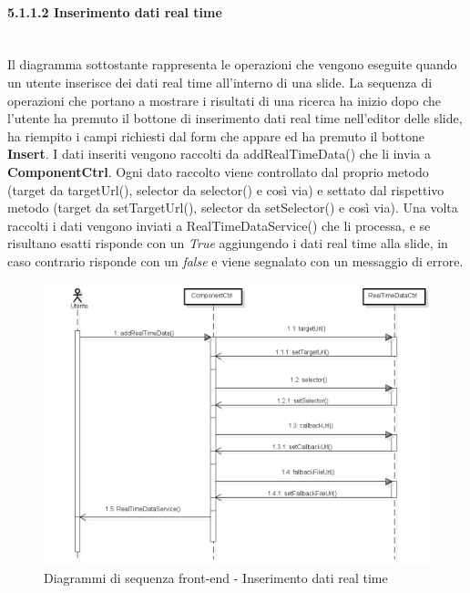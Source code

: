 \paragraph{5.1.1.2 Inserimento dati real time}\mbox{}\\

\noindent Il diagramma sottostante rappresenta le operazioni che vengono eseguite quando un utente inserisce dei dati real time all'interno di una slide. La sequenza di operazioni che portano a mostrare i risultati di una ricerca ha inizio dopo che l'utente ha premuto il bottone di inserimento dati real time nell'editor delle slide, ha riempito i campi richiesti dal form che appare ed ha premuto il bottone \textbf{Insert}. I dati inseriti vengono raccolti da addRealTimeData() che li invia a \textbf{ComponentCtrl}. Ogni dato raccolto viene controllato dal proprio metodo (target da targetUrl(), selector da selector() e così via) e settato dal rispettivo metodo (target da setTargetUrl(), selector da setSelector() e così via). Una volta raccolti i dati vengono inviati a RealTimeDataService() che li processa, e se risultano esatti risponde con un \textit{True} aggiungendo i dati real time alla slide, in caso contrario risponde con un \textit{false} e viene segnalato con un  messaggio di errore.

\begin{figure}[H] 
	\centering 
	\includegraphics[scale=0.60] {img/realtime.png}
	\caption{Diagrammi di sequenza front-end - Inserimento dati real time} 
\end{figure}